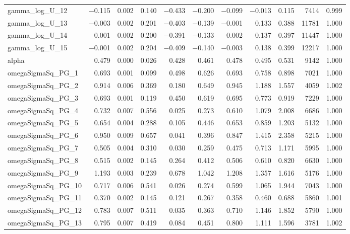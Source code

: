 \documentclass[12pt]{article}
\begin{document}
\begin{longtable}{lrrrrrrrrrr}
gamma\_log\_U\_12 & $-$0.115 & 0.002 & 0.140 & $-$0.433 & $-$0.200 & $-$0.099 & $-$0.013 &  0.115 &  7414 & 0.999 \\
gamma\_log\_U\_13 & $-$0.003 & 0.002 & 0.201 & $-$0.403 & $-$0.139 & $-$0.001 &  0.133 &  0.388 & 11781 & 1.000 \\
gamma\_log\_U\_14 &  0.001 & 0.002 & 0.200 & $-$0.391 & $-$0.133 &  0.002 &  0.137 &  0.397 & 11447 & 1.000 \\
gamma\_log\_U\_15 & $-$0.001 & 0.002 & 0.204 & $-$0.409 & $-$0.140 & $-$0.003 &  0.138 &  0.399 & 12217 & 1.000 \\
\addlinespace
alpha & 0.479 & 0.000 & 0.026 & 0.428 & 0.461 & 0.478 & 0.495 & 0.531 & 9142 & 1.000 \\
\addlinespace
omegaSigmaSq\_PG\_1   & 0.693 & 0.001 & 0.099 & 0.498 & 0.626 & 0.693 & 0.758 & 0.898 &  7021 & 1.000 \\
omegaSigmaSq\_PG\_2   & 0.914 & 0.006 & 0.369 & 0.180 & 0.649 & 0.945 & 1.188 & 1.557 &  4059 & 1.002 \\
omegaSigmaSq\_PG\_3   & 0.693 & 0.001 & 0.119 & 0.450 & 0.619 & 0.695 & 0.773 & 0.919 &  7229 & 1.000 \\
omegaSigmaSq\_PG\_4   & 0.732 & 0.007 & 0.556 & 0.025 & 0.273 & 0.610 & 1.079 & 2.008 &  6686 & 1.000 \\
omegaSigmaSq\_PG\_5   & 0.654 & 0.004 & 0.288 & 0.105 & 0.446 & 0.653 & 0.859 & 1.203 &  5132 & 1.000 \\
omegaSigmaSq\_PG\_6   & 0.950 & 0.009 & 0.657 & 0.041 & 0.396 & 0.847 & 1.415 & 2.358 &  5215 & 1.000 \\
omegaSigmaSq\_PG\_7   & 0.505 & 0.004 & 0.310 & 0.030 & 0.259 & 0.475 & 0.713 & 1.171 &  5995 & 1.000 \\
omegaSigmaSq\_PG\_8   & 0.515 & 0.002 & 0.145 & 0.264 & 0.412 & 0.506 & 0.610 & 0.820 &  6630 & 1.000 \\
omegaSigmaSq\_PG\_9   & 1.193 & 0.003 & 0.239 & 0.678 & 1.042 & 1.208 & 1.357 & 1.616 &  5176 & 1.000 \\
omegaSigmaSq\_PG\_10  & 0.717 & 0.006 & 0.541 & 0.026 & 0.274 & 0.599 & 1.065 & 1.944 &  7043 & 1.000 \\
omegaSigmaSq\_PG\_11  & 0.370 & 0.002 & 0.145 & 0.121 & 0.267 & 0.358 & 0.460 & 0.688 &  5860 & 1.001 \\
omegaSigmaSq\_PG\_12  & 0.783 & 0.007 & 0.511 & 0.035 & 0.363 & 0.710 & 1.146 & 1.852 &  5790 & 1.000 \\
omegaSigmaSq\_PG\_13  & 0.795 & 0.007 & 0.419 & 0.084 & 0.451 & 0.800 & 1.111 & 1.596 &  3781 & 1.002 \\

\end{longtable}
\end{document}
